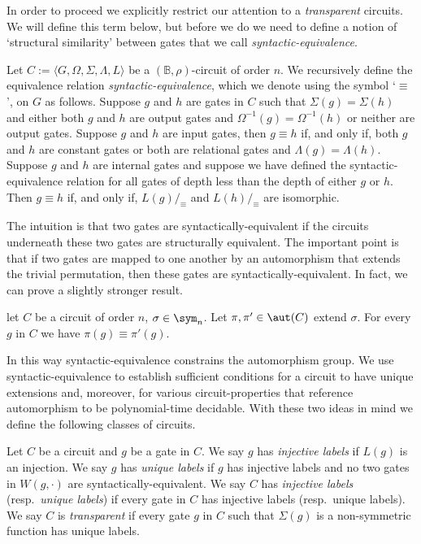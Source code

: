 \documentclass[a4paper,UKenglish]{lipics-v2018}
\begin{document}
In order to proceed we explicitly restrict our attention to a \emph{transparent}
circuits. We will define this term below, but before we do we need to define a
notion of `structural similarity' between gates that we call
\emph{syntactic-equivalence}.

\begin{definition}
  Let $C := \langle G, \Omega, \Sigma, \Lambda, L \rangle$ be a $(\mathbb{B},
  \rho)$-circuit of order $n$. We recursively define the equivalence relation
  \emph{syntactic-equivalence}, which we denote using the symbol `$\equiv$', on
  $G$ as follows. Suppose $g$ and $h$ are gates in $C$ such that $\Sigma (g) =
  \Sigma(h)$ and either both $g$ and $h$ are output gates and $\Omega^{-1}(g) =
  \Omega^{-1}(h)$ or neither are output gates. Suppose $g$ and $h$ are input
  gates, then $g \equiv h$ if, and only if, both $g$ and $h$ are constant gates
  or both are relational gates and $\Lambda(g) = \Lambda (h)$. Suppose $g$ and
  $h$ are internal gates and suppose we have defined the syntactic-equivalence
  relation for all gates of depth less than the depth of either $g$ or $h$. Then
  $g \equiv h$ if, and only if, $L(g) /_\equiv$ and $L(h) /_\equiv$ are
  isomorphic.
\end{definition}

The intuition is that two gates are syntactically-equivalent if the circuits
underneath these two gates are structurally equivalent. The important point is
that if two gates are mapped to one another by an automorphism that extends the
trivial permutation, then these gates are syntactically-equivalent. In fact, we
can prove a slightly stronger result.

\begin{lemma}
  let $C$ be a circuit of order $n$, $\sigma \in \sym_n$. Let $\pi, \pi' \in
  \aut(C)$ extend $\sigma$. For every $g$ in $C$ we have $\pi (g) \equiv \pi'
  (g)$.
  \label{lem:permutation-extending-syntactic-equivalence}
\end{lemma}

In this way syntactic-equivalence constrains the automorphism group. We use
syntactic-equivalence to establish sufficient conditions for a circuit to have
unique extensions and, moreover, for various circuit-properties that reference
automorphism to be polynomial-time decidable. With these two ideas in mind we
define the following classes of circuits.

\begin{definition}
  Let $C$ be a circuit and $g$ be a gate in $C$. We say $g$ has \emph{injective
    labels} if $L(g)$ is an injection. We say $g$ has \emph{unique labels} if
  $g$ has injective labels and no two gates in $W(g, \cdot)$ are
  syntactically-equivalent. We say $C$ has \emph{injective labels} (resp.\
  \emph{unique labels}) if every gate in $C$ has injective labels (resp.\ unique
  labels). We say $C$ is \emph{transparent} if every gate $g$ in $C$ such that
  $\Sigma(g)$ is a non-symmetric function has unique labels.
\end{definition}
\end{document}

